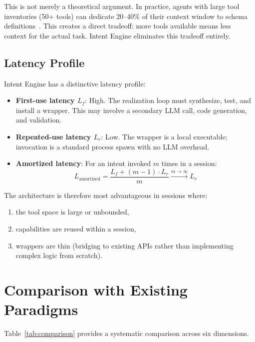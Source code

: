 \documentclass[11pt]{article}
\begin{document}
This is not merely a theoretical argument.
In practice, agents with large tool inventories (50+ tools) can dedicate 20--40\% of their context window to schema definitions~\citep{qin2024toolllm}.
This creates a direct tradeoff: more tools available means less context for the actual task.
Intent Engine eliminates this tradeoff entirely.

\subsection{Latency Profile}
\label{sec:latency}

Intent Engine has a distinctive latency profile:

\begin{itemize}[leftmargin=*]
  \item \textbf{First-use latency $L_f$}: High. The realization loop must synthesize, test, and install a wrapper. This may involve a secondary LLM call, code generation, and validation.
  \item \textbf{Repeated-use latency $L_r$}: Low. The wrapper is a local executable; invocation is a standard process spawn with no LLM overhead.
  \item \textbf{Amortized latency}: For an intent invoked $m$ times in a session:
  \[
  L_{\text{amortized}} = \frac{L_f + (m-1) \cdot L_r}{m} \xrightarrow{m \to \infty} L_r
  \]
\end{itemize}

The architecture is therefore most advantageous in sessions where:
\begin{enumerate}[leftmargin=*]
  \item the tool space is large or unbounded,
  \item capabilities are reused within a session,
  \item wrappers are thin (bridging to existing APIs rather than implementing complex logic from scratch).
\end{enumerate}

\section{Comparison with Existing Paradigms}
\label{sec:comparison}

Table~\ref{tab:comparison} provides a systematic comparison across six dimensions.
\end{document}
